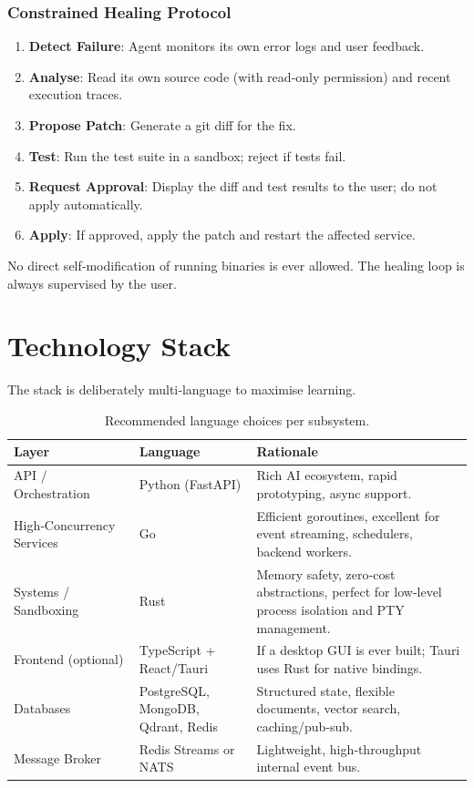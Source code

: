 \documentclass[12pt,a4paper]{article}
\begin{document}
\subsubsection{Constrained Healing Protocol}
\begin{enumerate}[leftmargin=*]
    \item \textbf{Detect Failure}: Agent monitors its own error logs and user feedback.
    \item \textbf{Analyse}: Read its own source code (with read‑only permission) and recent execution traces.
    \item \textbf{Propose Patch}: Generate a git diff for the fix.
    \item \textbf{Test}: Run the test suite in a sandbox; reject if tests fail.
    \item \textbf{Request Approval}: Display the diff and test results to the user; do not apply automatically.
    \item \textbf{Apply}: If approved, apply the patch and restart the affected service.
\end{enumerate}

No direct self‑modification of running binaries is ever allowed. The healing loop is always supervised by the user.

\section{Technology Stack}
The stack is deliberately multi‑language to maximise learning.

\begin{table}[h!]
\centering
\begin{tabular}{@{}llp{6cm}@{}}
\toprule
\textbf{Layer} & \textbf{Language} & \textbf{Rationale} \\
\midrule
API / Orchestration & Python (FastAPI) & Rich AI ecosystem, rapid prototyping, async support. \\
High‑Concurrency Services & Go & Efficient goroutines, excellent for event streaming, schedulers, backend workers. \\
Systems / Sandboxing & Rust & Memory safety, zero‑cost abstractions, perfect for low‑level process isolation and PTY management. \\
Frontend (optional) & TypeScript + React/Tauri & If a desktop GUI is ever built; Tauri uses Rust for native bindings. \\
Databases & PostgreSQL, MongoDB, Qdrant, Redis & Structured state, flexible documents, vector search, caching/pub‑sub. \\
Message Broker & Redis Streams or NATS & Lightweight, high‑throughput internal event bus. \\
\bottomrule
\end{tabular}
\caption{Recommended language choices per subsystem.}
\end{table}
\end{document}
